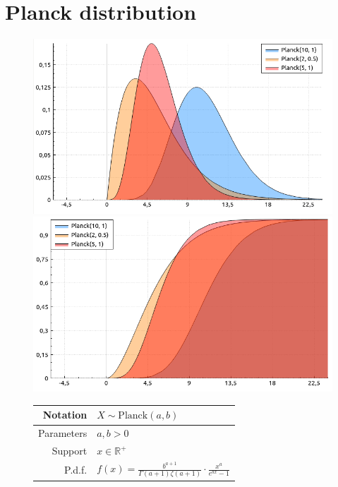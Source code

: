 \documentclass[a4paper,11pt]{article}
\theoremstyle{plain}
\theoremstyle{definition}
\newcommand{\MR}{\mathbb{R}}
\begin{document}
	
	\section{Planck distribution}
	
	\begin{figure}[!htb]\centering
		\begin{minipage}{0.55\textwidth}
			\includegraphics[width=\linewidth, right]{planck_pdf}
			\captionsetup{labelformat=empty}
			\includegraphics[width=\linewidth, right]{planck_cdf}
			\captionsetup{labelformat=empty}
		\end{minipage}
		\begin{minipage}{0.4\textwidth}
		\begin{tabular}{| r | l |}
			\hline
			Notation & $X \sim \mathrm{Planck}(a, b)$ \\
			\hline
			Parameters & $a, b > 0$ \\
			\hline
			Support & $ x \in \MR^+$  \\
			\hline
			P.d.f. & $f(x) = \frac{b^{a+1}}{\Gamma(a+1)\zeta(a+1)} \cdot \frac{x ^ a}{e^{bx} - 1}$ \\

\end{tabular}
\end{minipage}
\end{figure}
\end{document}
